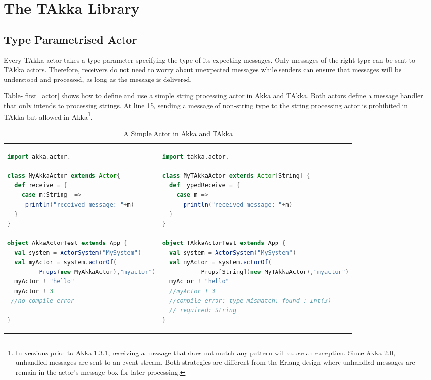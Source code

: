 \section{The TAkka Library}
\subsection{Type Parametrised Actor}
Every TAkka actor takes a type parameter specifying the type of its expecting messages.  Only messages of the right type can be sent to TAkka actors.  Therefore, receivers do not need to worry about unexpected messages while senders can ensure that messages will be understood and processed, as long as the message is delivered.

Table-\ref{first_actor} shows how to define and use a simple string processing actor in Akka and TAkka.  Both actors define a message handler that only intends to processing strings.  At line 15, sending a message of non-string type to the string processing actor is prohibited in TAkka but allowed in Akka\footnote{In versions prior to Akka 1.3.1, receiving a message that does not match any pattern will cause an exception.  Since Akka 2.0, unhandled messages are sent to an event stream.  Both strategies are different from the Erlang design where unhandled messages are remain in the actor\rq{}s message box for later processing.}.

\begin{table}
\label{first_actor}
  \begin{adjustwidth}{-0.5cm}{}
  \begin{tabular}{ l l }
      \begin{lstlisting}[language=scala]
import akka.actor._

class MyAkkaActor extends Actor{
  def receive = {
    case m:String  =>
     println("received message: "+m)
  }
}

object AkkaActorTest extends App {
  val system = ActorSystem("MySystem")
  val myActor = system.actorOf(
         Props(new MyAkkaActor),"myactor")
  myActor ! "hello"
  myActor ! 3
 //no compile error

}
      \end{lstlisting}
&
      \begin{lstlisting}[language=scala]
import takka.actor._

class MyTAkkaActor extends Actor[String] {
  def typedReceive = {
    case m =>
      println("received message: "+m)
  }
}

object TAkkaActorTest extends App {
  val system = ActorSystem("MySystem")
  val myActor = system.actorOf(
           Props[String](new MyTAkkaActor),"myactor")
  myActor ! "hello"
  //myActor ! 3
  //compile error: type mismatch; found : Int(3)
  // required: String
}
      \end{lstlisting}
  \end{tabular}
  \caption{A Simple Actor in Akka and TAkka}
  \end{adjustwidth}
  \label{my_table}
\end{table}


